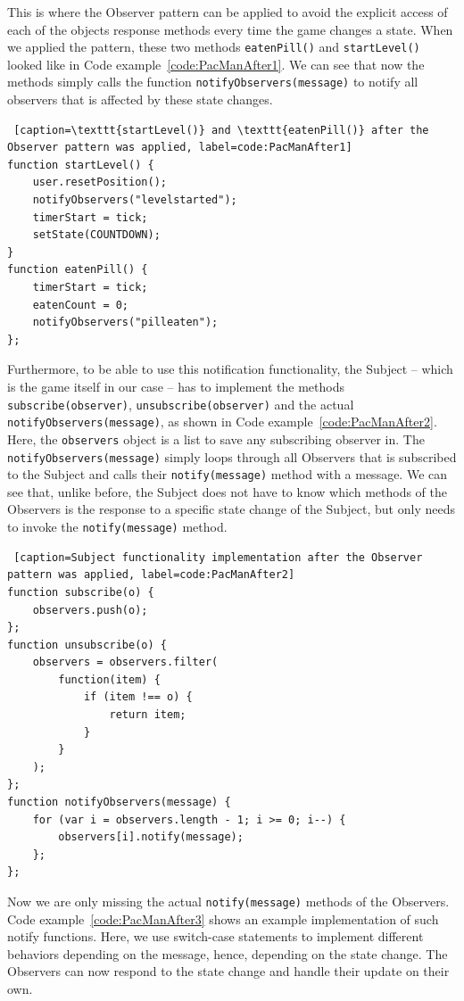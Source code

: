 \documentclass{bioinfo}
\begin{document}
This is where the Observer pattern can be applied to avoid the explicit access of each of the objects response methods every time the game changes a state. When we applied the pattern, these two methods \texttt{eatenPill()} and \texttt{startLevel()} looked like in Code example~\ref{code:PacManAfter1}. We can see that now the methods simply calls the function \texttt{notifyObservers(message)} to notify all observers that is affected by these state changes.

\begin{lstlisting} [caption=\texttt{startLevel()} and \texttt{eatenPill()} after the Observer pattern was applied, label=code:PacManAfter1]
function startLevel() {        
    user.resetPosition();
    notifyObservers("levelstarted");
    timerStart = tick;
    setState(COUNTDOWN);
}
function eatenPill() {
    timerStart = tick;
    eatenCount = 0;
    notifyObservers("pilleaten");
};
\end{lstlisting}

Furthermore, to be able to use this notification functionality, the Subject – which is the game itself in our case – has to implement the methods \texttt{subscribe(observer)}, \texttt{unsubscribe(observer)} and the actual \texttt{notifyObservers(message)}, as shown in Code example~\ref{code:PacManAfter2}. Here, the \texttt{observers} object is a list to save any subscribing observer in. The \texttt{notifyObservers(message)} simply loops through all Observers that is subscribed to the Subject and calls their \texttt{notify(message)} method with a message. We can see that, unlike before, the Subject does not have to know which methods of the Observers is the response to a specific state change of the Subject, but only needs to invoke the \texttt{notify(message)} method.

\begin{lstlisting} [caption=Subject functionality implementation after the Observer pattern was applied, label=code:PacManAfter2]
function subscribe(o) {
    observers.push(o);
};
function unsubscribe(o) {
    observers = observers.filter(
        function(item) {
            if (item !== o) {
                return item;
            }
        }
    );
};
function notifyObservers(message) {
    for (var i = observers.length - 1; i >= 0; i--) {
        observers[i].notify(message);
    };
};
\end{lstlisting}

Now we are only missing the actual \texttt{notify(message)} methods of the Observers. Code example~\ref{code:PacManAfter3} shows an example implementation of such notify functions. Here, we use switch-case statements to implement different behaviors depending on the message, hence, depending on the state change. The Observers can now respond to the state change and handle their update on their own.
\end{document}
